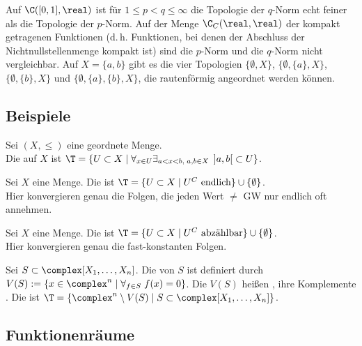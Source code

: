 \begin{Bsp}
    Auf $\C([0,1], \real)$ ist für $1 \le p < q \le \infty$ die Topologie der
    $q$-Norm echt feiner als die Topologie der $p$-Norm.
    Auf der Menge $\C_C(\real, \real)$ der kompakt getragenen Funktionen
    (d.\,h. Funktionen, bei denen der Abschluss der Nichtnullstellenmenge
    kompakt ist) sind die $p$-Norm und die $q$-Norm nicht vergleichbar.
    Auf $X = \{a, b\}$ gibt es die vier Topologien
    $\{\emptyset, X\}$, $\{\emptyset, \{a\}, X\}$, $\{\emptyset, \{b\}, X\}$
    und $\{\emptyset, \{a\}, \{b\}, X\}$, die rautenförmig angeordnet
    werden können.
\end{Bsp}

\subsection{%
    Beispiele%
}

Sei $(X, \le)$ eine geordnete Menge. \\
Die  auf $X$ ist $\T =
\{U \subset X \;|\; \forall_{x \in U} \exists_{a < x < b,\; a, b \in X}\;
\left]a,b\right[ \subset U\}$.

Sei $X$ eine Menge.
Die  ist
$\T = \{U \subset X \;|\; U^C \text{ endlich}\} \cup
\{\emptyset\}$. \\
Hier konvergieren genau die Folgen, die jeden Wert $\not=$ GW nur endlich oft
annehmen.

Sei $X$ eine Menge.
Die  ist
$\T = \{U \subset X \;|\; U^C \text{ abzählbar}\} \cup
\{\emptyset\}$. \\
Hier konvergieren genau die fast-konstanten Folgen.

Sei $S \subset \complex[X_1, \dotsc, X_n]$.
Die  von $S$ ist definiert durch \\
$V(S) := \{x \in \complex^n \;|\; \forall_{f \in S}\; f(x) = 0\}$.
Die $V(S)$ heißen ,
ihre Komplemente .
Die  ist
$\T = \{\complex^n \setminus V(S) \;|\;
S \subset \complex[X_1, \dotsc, X_n]\}$.

\subsection{%
    Funktionenräume%
}

